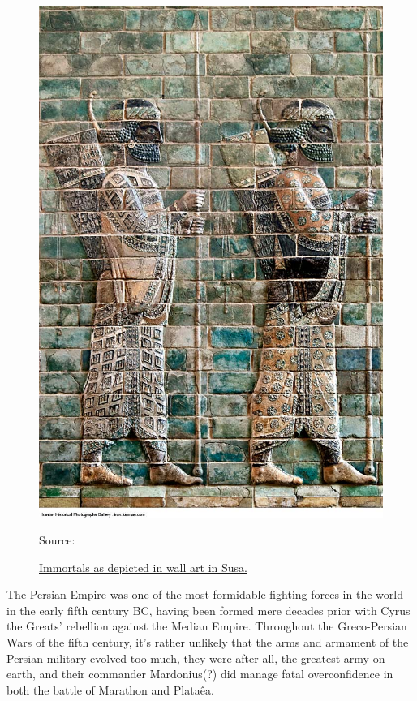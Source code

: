 \documentclass[twoside, a4paper, 12pt]{article}
\newcommand{\source}[1]{\caption*{Source: {#1}} }
\begin{document}
\par\vspace{1em}

\begin{figure}
  \centering
  \includegraphics[width=\linewidth]{ImmortalsSusa.jpg}
  \captionsetup{justification=raggedright}
  \caption{\ul{Immortals as depicted in wall art in Susa.}}
  \source{\cite{iranian_historical_photography}}
  \label{img:ImmortalSusa}
\end{figure}

The Persian Empire was one of the most formidable fighting forces in the world
in the early fifth century BC, having been formed mere decades prior with
Cyrus the Greats' rebellion against the Median Empire. Throughout the
Greco-Persian Wars of the fifth century, it's rather unlikely that the arms
and armament of the Persian military evolved too much, they were after all,
the greatest army on earth, and their commander Mardonius(?) did manage
fatal overconfidence in both the battle of Marathon and Plata\^ea.
\end{document}
